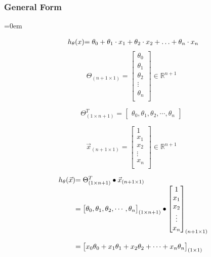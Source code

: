 \subsubsectionend
\subsubsection{General Form}
\label{sssec:general_form}
\parindent=0em

\[
	\begin{array}{ l@{} l@{}} 
	h_\theta(x) & = 
	\theta_0
	+ \theta_1 \cdot x_1
	+ \theta_2 \cdot x_2
	+ \ldots
	+ \theta_n \cdot x_n
	\end{array}
\]
\[
	\Theta_{(n+1 \times 1)}
	=
	\begin{bmatrix}
	\theta_0 \\
	\theta_1 \\
	\theta_2 \\
	\vdots \\
	\theta_n \\
	\end{bmatrix}
	\in \mathbb{R}^{n + 1}
\]

\[
	\Theta_{(1 \times n+1)}^{T}
	=
	\begin{bmatrix}
		\theta_0 ,
		\theta_1 ,
		\theta_2 ,
		\cdots ,
		\theta_n
	\end{bmatrix} 
\]

\[
	\vec{x}_{(n+1 \times 1)}
	=
	\begin{bmatrix}
		1 \\
		x_1 \\
		x_2 \\
		\vdots \\
		x_n \\
	\end{bmatrix}
	\in \mathbb{R}^{n + 1}
\]

\[
\begin{array}{ l@{} l@{} l@{}}
h_\theta (\vec{x})
	& = \Theta_{(1 \times n+1)}^{T} \bullet \vec{x}_{(n+1 \times 1)}
\\
& =
	\begin{bmatrix}
	\theta_0 ,
	\theta_1 ,
	\theta_2 ,
	\cdots ,
	\theta_n
	\end{bmatrix}_{(1 \times n+1)}
	\bullet
	\begin{bmatrix}
		1 \\
		x_1 \\
		x_2 \\
		\vdots \\
		x_n \\
	\end{bmatrix}_{(n+1 \times 1)}
\\ \\
& =
\begin{bmatrix}
	x_0\theta_0 +
	x_1\theta_1 +
	x_2\theta_2 +
	\cdots +
	x_n\theta_n \\
\end{bmatrix}_{(1 \times 1)}
\end{array}
\]

